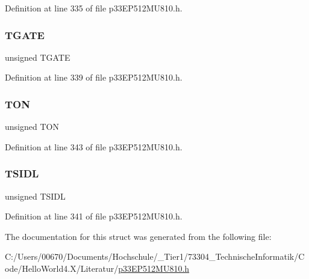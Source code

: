 Definition at line 335 of file p33\+E\+P512\+M\+U810.\+h.

\mbox{\label{structtag_t4_c_o_n_b_i_t_s_a35b6e4b591a8bd20e026168399eb0e6a}} 
\subsubsection{\texorpdfstring{T\+G\+A\+TE}{TGATE}}
{\footnotesize\ttfamily unsigned T\+G\+A\+TE}



Definition at line 339 of file p33\+E\+P512\+M\+U810.\+h.

\mbox{\label{structtag_t4_c_o_n_b_i_t_s_a8c2a094047d1019ce1c5b25ea8cff9b3}} 
\subsubsection{\texorpdfstring{T\+ON}{TON}}
{\footnotesize\ttfamily unsigned T\+ON}



Definition at line 343 of file p33\+E\+P512\+M\+U810.\+h.

\mbox{\label{structtag_t4_c_o_n_b_i_t_s_a4971b881615ef42703b5b78179fcda3d}} 
\subsubsection{\texorpdfstring{T\+S\+I\+DL}{TSIDL}}
{\footnotesize\ttfamily unsigned T\+S\+I\+DL}



Definition at line 341 of file p33\+E\+P512\+M\+U810.\+h.



The documentation for this struct was generated from the following file\+:\begin{DoxyCompactItemize}
\item 
C\+:/\+Users/00670/\+Documents/\+Hochschule/\+\_\+\+Tier1/73304\+\_\+\+Technische\+Informatik/\+Code/\+Hello\+World4.\+X/\+Literatur/\hyperlink{p33_e_p512_m_u810_8h}{p33\+E\+P512\+M\+U810.\+h}\end{DoxyCompactItemize}
